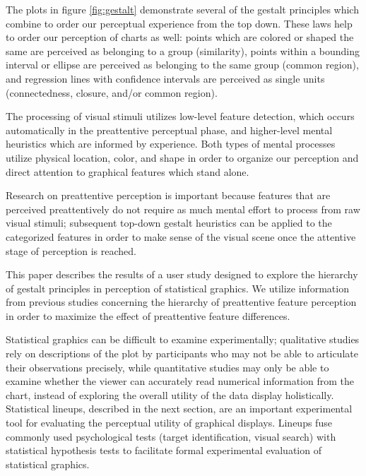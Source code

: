 \documentclass[11pt]{isuthesis}\usepackage[]{graphicx}\usepackage[]{color}
\begin{document}
The plots in figure \ref{fig:gestalt} demonstrate several of the gestalt principles which combine to order our perceptual experience from the top down. These laws help to order our perception of charts as well: points which are colored or shaped the same are perceived as belonging to a group (similarity), points within a bounding interval or ellipse are perceived as belonging to the same group (common region), and regression lines with confidence intervals are perceived as single units (connectedness, closure, and/or common region). 

The processing of visual stimuli utilizes low-level feature detection, which occurs automatically in the preattentive perceptual phase, and higher-level mental heuristics which are informed by experience. Both types of mental processes utilize physical location, color, and shape in order to organize our perception and direct attention to graphical features which stand alone. 

Research on preattentive perception is important because features that are perceived preattentively do not require as much mental effort to process from raw visual stimuli; subsequent top-down gestalt heuristics can be applied to the categorized features in order to make sense of the visual scene once the attentive stage of perception is reached. 

This paper describes the results of a user study designed to explore the hierarchy of gestalt principles in perception of statistical graphics. We utilize information from previous studies \citep{heer:2014, robinson:03} concerning the hierarchy of preattentive feature perception in order to maximize the effect of preattentive feature differences. 

Statistical graphics can be difficult to examine experimentally; qualitative studies rely on descriptions of the plot by participants who may not be able to articulate their observations precisely, while quantitative studies may only be able to examine whether the viewer can accurately read numerical information from the chart, instead of exploring the overall utility of the data display holistically. Statistical lineups, described in the next section, are an important experimental tool for evaluating the perceptual utility of graphical displays. Lineups fuse commonly used psychological tests (target identification, visual search) \citep{visualreasoning} with statistical hypothesis tests to facilitate formal experimental evaluation of statistical graphics. 
\end{document}
